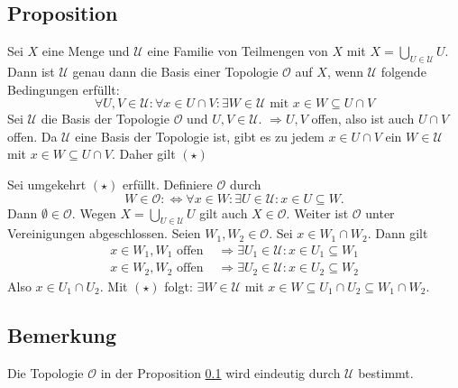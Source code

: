 \subsection[Proposition: Bedingung, dass eine Familie von Teilmengen eine Topologie ist]{Proposition} %
\label{sub:116}
Sei $X$ eine Menge und $\mathcal{U} $ eine Familie von Teilmengen von $X$ mit $X = \bigcup_{U \in \mathcal{U} } U$. Dann ist $\mathcal{U} $ genau dann die Basis einer Topologie 
$\mathcal{O}$ auf $X$, wenn $\mathcal{U} $ folgende Bedingungen erfüllt:
\[
	\forall U,V \in \mathcal{U} : \forall x \in U \cap V : \exists W \in \mathcal{U}  \text{ mit } x \in W \subseteq U \cap V \tag*{$(\star)$}
\]
Sei $\mathcal{U} $ die Basis der Topologie $\mathcal{O} $ und $U,V \in \mathcal{U} $. $\Rightarrow U,V$ offen, also ist auch $U \cap V$ offen. Da $\mathcal{U} $ eine Basis
der Topologie ist, gibt es zu jedem $x \in U \cap V$ ein $W \in \mathcal{U} $ mit $x \in W \subseteq U \cap V$. Daher gilt $(\star)$  

Sei umgekehrt $(\star)$ erfüllt. Definiere $\mathcal{O} $ durch
\[
	W \in \mathcal{O} :\Longleftrightarrow \forall x \in W : \exists U \in \mathcal{U} : x \in U \subseteq W.  
\]
Dann $\emptyset \in \mathcal{O} $. Wegen $X = \bigcup_{U \in \mathcal{U} } U$ gilt auch $X \in \mathcal{O} $. Weiter ist $\mathcal{O} $ unter Vereinigungen abgeschlossen.
Seien $W_1, W_2 \in \mathcal{O} $. Sei $x \in W_1 \cap W_2$. Dann gilt
\begin{align*}
	x \in W_1, W_1 \text{ offen } &\Rightarrow  \exists U_1 \in \mathcal{U} : x \in U_1 \subseteq W_1 \\
	x \in W_2, W_2 \text{ offen } &\Rightarrow \exists U_2 \in \mathcal{U} : x \in U_2 \subseteq W_2 
\end{align*}
Also $x \in U_1 \cap U_2$. Mit $(\star)$ folgt: $\exists W \in \mathcal{U} $ mit $x \in W \subseteq U_1 \cap U_2 \subseteq W_1 \cap W_2$. \bewende

\subsection[Bemerkung: Eindeutigkeit von Proposition \ref{sub:116}]{Bemerkung} %
\label{sub:117}
Die Topologie $\mathcal{O}$ in der Proposition \ref{sub:116} wird eindeutig durch $\mathcal{U}$ bestimmt.

